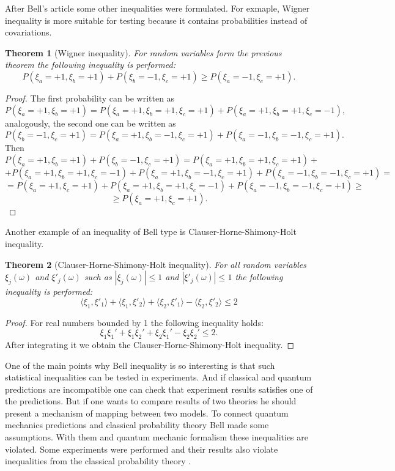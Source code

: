 \documentclass[11pt]{article}
\newtheorem{theorem}{Theorem}[section]
\begin{document}
After Bell's article some other inequalities were formulated. For exmaple, Wigner inequality is more suitable for testing because it contains probabilities instead of covariations.
\begin{theorem}[Wigner inequality]
For random variables form the previous theorem the following inequality is performed:
\[
P(\xi_a = +1, \xi_b = +1) + P(\xi_b = -1, \xi_c = +1) \geq P(\xi_a = -1, \xi_c = +1).
\]
\end{theorem}

\begin{proof}
The first probability can be written as 
\[
P(\xi_a = +1, \xi_b = +1) = P(\xi_a = +1, \xi_b = +1, \xi_c = +1) + P(\xi_a = +1, \xi_b = +1, \xi_c = -1),
\]
analogously, the second one can be written as
\[
P(\xi_b = -1, \xi_c = +1) = P(\xi_a = +1, \xi_b = -1, \xi_c = +1) + P(\xi_a = -1, \xi_b = -1, \xi_c = +1).
\]
Then
\[
P(\xi_a = +1, \xi_b = +1) + P(\xi_b = -1, \xi_c = +1) = P(\xi_a = +1, \xi_b = +1, \xi_c = +1) + 
\] 
\[
 + P(\xi_a = +1, \xi_b = +1, \xi_c = -1) + P(\xi_a = +1, \xi_b = -1, \xi_c = +1) + P(\xi_a = -1, \xi_b = -1, \xi_c = +1) = 
\]
\[
 =  P(\xi_a = +1, \xi_c = +1) + P(\xi_a = +1, \xi_b = +1, \xi_c = -1) + P(\xi_a = -1, \xi_b = -1, \xi_c = +1)\geq
\]
\[
 \geq P(\xi_a = +1, \xi_c = +1).
\]
\end{proof}

Another example of an inequality of Bell type is Clauser-Horne-Shimony-Holt inequality.
\begin{theorem}[Clauser-Horne-Shimony-Holt inequality]
For all random variables $\xi_j(\omega)$ and $\xi'_j(\omega)$ such as $|\xi_j(\omega)| \leq 1$ and $|\xi'_j(\omega)| \leq 1$ the following inequality is performed:
\[
\langle\xi_1,\xi'_1\rangle + \langle\xi_1,\xi'_2\rangle + \langle\xi_2,\xi'_1\rangle -  \langle\xi_2,\xi'_2\rangle \leq 2
\]
\end{theorem}

\begin{proof}
For real numbers bounded by 1 the following inequality holds:
\[
\xi_1\xi_1' + \xi_1\xi_2' + \xi_2\xi_1' - \xi_2\xi_2' \leq 2.
\]
After integrating it we obtain the Clauser-Horne-Shimony-Holt inequality.

\end{proof}

One of the main points why Bell inequality is so interesting is that such statistical inequalities can be tested in experiments. And if classical and quantum predictions are incompatible one can check that experiment results satisfies one of the predictions. But if one wants to compare results of two theories he should present a mechanism of mapping between two models. To connect quantum mechanics predictions and classical probability theory Bell made some assumptions. With them and quantum mechanic formalism these inequalities are violated. Some experiments were performed and their results also violate inequalities from the classical probability theory \cite{ASP1}. 
\end{document}
